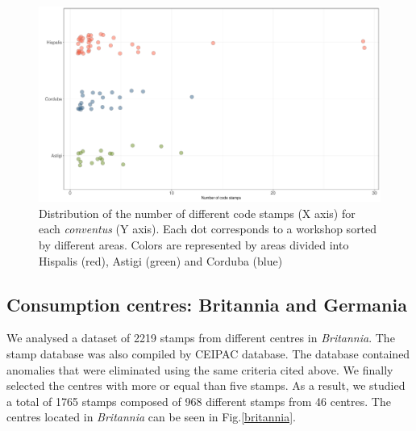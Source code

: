 \documentclass[review]{elsarticle}
\newcommand{\memo}[2]{\textcolor{#1}{#2}}
\newcommand{\xavi}[1]{\memo{magenta}{XRC: #1\\}}
\begin{document}
\begin{figure}[htp]
	\centering
\includegraphics[width=\linewidth]{figs/frequency}
\caption{Distribution of the number of different code stamps (X axis) for each \textit{conventus} (Y axis). Each dot corresponds to a workshop sorted by different areas. Colors are represented by areas divided into Hispalis (red), Astigi (green) and Corduba (blue)}
\label{frequency}
\end{figure} 



\subsection{Consumption centres: Britannia and Germania}


We analysed a dataset of 2219 stamps from different centres in \textit{Britannia}. 
The stamp database was also compiled by CEIPAC database. The database contained anomalies that were eliminated using the same criteria cited above. We finally selected the centres with more or equal than five stamps. As a result, we studied a total of 1765 stamps composed of 968 different stamps from 46 centres.
The centres located in \textit{Britannia} can be seen in Fig.\ref{britannia}.
 
\end{document}
